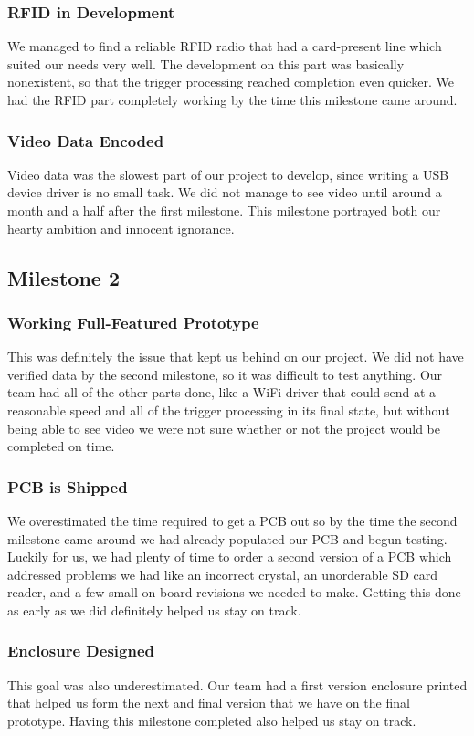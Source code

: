 \documentclass[12pt]{article}
\begin{document}
\subsubsection{RFID in Development}
We managed to find a reliable RFID radio that had a card-present line which
suited our needs very well. The development on this part was basically
nonexistent, so that the trigger processing reached completion even quicker. We
had the RFID part completely working by the time this milestone came around.

\subsubsection{Video Data Encoded}
Video data was the slowest part of our project to develop, since writing a USB
device driver is no small task. We did not manage to see video until around a
month and a half after the first milestone. This milestone portrayed both our
hearty ambition and innocent ignorance.

\subsection{Milestone 2}
\subsubsection{Working Full-Featured Prototype}
This was definitely the issue that kept us behind on our project. We did not
have verified data by the second milestone, so it was difficult to test
anything. Our team had all of the other parts done, like a WiFi driver that
could send at a reasonable speed and all of the trigger processing in its final
state, but without being able to see video we were not sure whether or not the
project would be completed on time.

\subsubsection{PCB is Shipped}
We overestimated the time required to get a PCB out so by the time the second
milestone came around we had already populated our PCB and begun testing.
Luckily for us, we had plenty of time to order a second version of a PCB which
addressed problems we had like an incorrect crystal, an unorderable SD card
reader, and a few small on-board revisions we needed to make. Getting this done
as early as we did definitely helped us stay on track.

\subsubsection{Enclosure Designed}
This goal was also underestimated. Our team had a first version enclosure
printed that helped us form the next and final version that we have on the
final prototype. Having this milestone completed also helped us stay on track.
\end{document}
